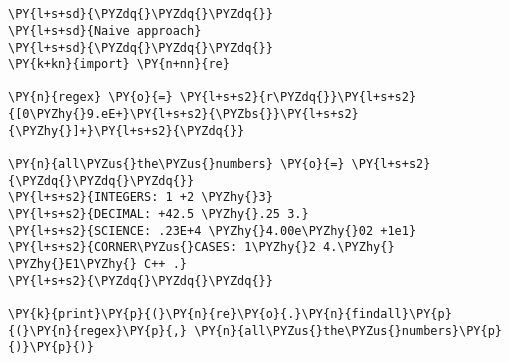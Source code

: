 

\section*{}

\begin{Verbatim}[commandchars=\\\{\}]
\PY{l+s+sd}{\PYZdq{}\PYZdq{}\PYZdq{}}
\PY{l+s+sd}{Naive approach}
\PY{l+s+sd}{\PYZdq{}\PYZdq{}\PYZdq{}}
\PY{k+kn}{import} \PY{n+nn}{re}

\PY{n}{regex} \PY{o}{=} \PY{l+s+s2}{r\PYZdq{}}\PY{l+s+s2}{[0\PYZhy{}9.eE+}\PY{l+s+s2}{\PYZbs{}}\PY{l+s+s2}{\PYZhy{}]+}\PY{l+s+s2}{\PYZdq{}}

\PY{n}{all\PYZus{}the\PYZus{}numbers} \PY{o}{=} \PY{l+s+s2}{\PYZdq{}\PYZdq{}\PYZdq{}}
\PY{l+s+s2}{INTEGERS: 1 +2 \PYZhy{}3}
\PY{l+s+s2}{DECIMAL: +42.5 \PYZhy{}.25 3.}
\PY{l+s+s2}{SCIENCE: .23E+4 \PYZhy{}4.00e\PYZhy{}02 +1e1}
\PY{l+s+s2}{CORNER\PYZus{}CASES: 1\PYZhy{}2 4.\PYZhy{} \PYZhy{}E1\PYZhy{} C++ .}
\PY{l+s+s2}{\PYZdq{}\PYZdq{}\PYZdq{}}

\PY{k}{print}\PY{p}{(}\PY{n}{re}\PY{o}{.}\PY{n}{findall}\PY{p}{(}\PY{n}{regex}\PY{p}{,} \PY{n}{all\PYZus{}the\PYZus{}numbers}\PY{p}{)}\PY{p}{)}
\end{Verbatim}
